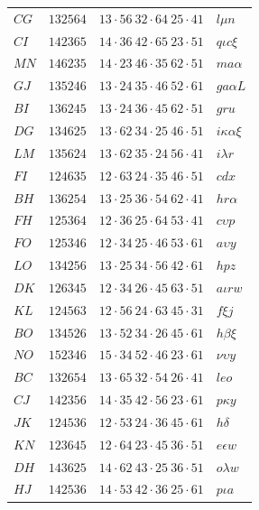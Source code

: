 \documentclass[11pt,a4paper]{article}
\theoremstyle{definition}
\begin{document}
\begin{center}
\small
\begin{tabular}{llll}
$CG$ & $132564$ & $13 \cdot 56\ 32 \cdot 64\ 25 \cdot 41$ & $l\mu n$\\
$CI$ & $142365$ & $14 \cdot 36\ 42 \cdot 65\ 23 \cdot 51$ & $q\iota c\xi$\\
$MN$ & $146235$ & $14 \cdot 23\ 46 \cdot 35\ 62 \cdot 51$ & $ma\alpha$\\
$GJ$ & $135246$ & $13 \cdot 24\ 35 \cdot 46\ 52 \cdot 61$ & $ga\alpha L$\\
$BI$ & $136245$ & $13 \cdot 24\ 36 \cdot 45\ 62 \cdot 51$ & $gru$\\
$DG$ & $134625$ & $13 \cdot 62\ 34 \cdot 25\ 46 \cdot 51$ & $i\kappa\alpha\xi$\\
$LM$ & $135624$ & $13 \cdot 62\ 35 \cdot 24\ 56 \cdot 41$ & $i\lambda r$\\
$FI$ & $124635$ & $12 \cdot 63\ 24 \cdot 35\ 46 \cdot 51$ & $cdx$\\
$BH$ & $136254$ & $13 \cdot 25\ 36 \cdot 54\ 62 \cdot 41$ & $hr\alpha$\\
$FH$ & $125364$ & $12 \cdot 36\ 25 \cdot 64\ 53 \cdot 41$ & $c\upsilon p$\\
$FO$ & $125346$ & $12 \cdot 34\ 25 \cdot 46\ 53 \cdot 61$ & $a\upsilon y$\\
$LO$ & $134256$ & $13 \cdot 25\ 34 \cdot 56\ 42 \cdot 61$ & $hpz$\\
$DK$ & $126345$ & $12 \cdot 34\ 26 \cdot 45\ 63 \cdot 51$ & $a\iota rw$\\
$KL$ & $124563$ & $12 \cdot 56\ 24 \cdot 63\ 45 \cdot 31$ & $f\xi j$\\
$BO$ & $134526$ & $13 \cdot 52\ 34 \cdot 26\ 45 \cdot 61$ & $h\beta\xi$\\
$NO$ & $152346$ & $15 \cdot 34\ 52 \cdot 46\ 23 \cdot 61$ & $\nu\upsilon y$\\
$BC$ & $132654$ & $13 \cdot 65\ 32 \cdot 54\ 26 \cdot 41$ & $leo$\\
$CJ$ & $142356$ & $14 \cdot 35\ 42 \cdot 56\ 23 \cdot 61$ & $p\kappa y$\\
$JK$ & $124536$ & $12 \cdot 53\ 24 \cdot 36\ 45 \cdot 61$ & $h\delta$\\
$KN$ & $123645$ & $12 \cdot 64\ 23 \cdot 45\ 36 \cdot 51$ & $e\epsilon w$\\
$DH$ & $143625$ & $14 \cdot 62\ 43 \cdot 25\ 36 \cdot 51$ & $o\lambda w$\\
$HJ$ & $142536$ & $14 \cdot 53\ 42 \cdot 36\ 25 \cdot 61$ & $p\iota a$\\

\end{tabular}
\end{center}
\end{document}
